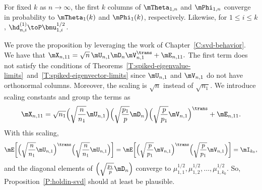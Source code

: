 \begin{proposition}\label{P:holdin-svd}
    For fixed $k$ as $n\to\infty$, the first $k$ columns of $\mTheta_{1,n}$
    and $\mPhi_{1,n}$ converge in probability to $\mTheta_{1}(k)$ and 
    $\mPhi_{1}(k)$, respectively.  Likewise, for $1 \leq i \leq k$,
    $\hd_{n,i}^{(1)} \toP \bmu_{1,i}^{1/2}$.
\end{proposition}

We prove the proposition by leveraging the work of 
Chapter~\ref{C:svd-behavior}.  We have that 
\(
    \mX_{n,11} = \sqrt{n} \, \mU_{n,1} \mD_n \mV_{n,1}^\trans + \mE_{n,11}.
\)
The first term does not satisfy the conditions of Theorems~\ref{T:spiked-eigenvalue-limits}~and~\ref{T:spiked-eigenvector-limits} since $\mU_{n,1}$ and $\mV_{n,1}$ do not have orthonormal columns.  Moreover, the scaling is $\sqrt{n}$ instead of $\sqrt{n_1}$.  We introduce scaling constants and group the terms as
\begin{equation}
    \mX_{n,11}
        =
            \sqrt{n_1}
            \Big(
                \sqrt{\frac{n}{n_1}} \mU_{n,1}
            \Big)
            \Big(
                \sqrt{\frac{p_1}{p}} \mD_n
            \Big)
            \Big(
                \sqrt{\frac{p}{p_1}}
                \mV_{n,1}
            \Big)^\trans
            +
            \mE_{n,11}.
\end{equation}
With this scaling,
\[
    \mE \bigg[
        \Big( \sqrt{\frac{n}{n_1}} \mU_{n,1} \Big)^\trans
        \Big( \sqrt{\frac{n}{n_1}} \mU_{n,1} \Big)
    \bigg]
    =
    \mE \bigg[
        \Big( \sqrt{\frac{p}{p_1}} \mV_{n,1} \Big)^\trans
        \Big( \sqrt{\frac{p}{p_1}} \mV_{n,1} \Big)
    \bigg]
    =
    \mI_{k_0},
\]
and the diagonal elements of
\(
    \Big(
          \sqrt{\frac{p_1}{p}} \mD_n
    \Big)
\)
converge to 
\(
    \mu_{1,1}^{1/2},
    \mu_{1,2}^{1/2},
    \ldots,
    \mu_{1,k_0}^{1/2}.
\)
So, Proposition~\ref{P:holdin-svd} should at least be plausible.  

